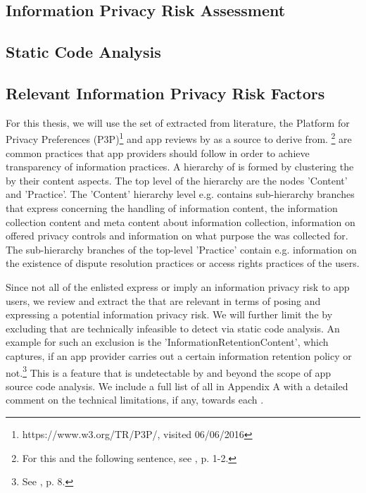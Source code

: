 \subsection{Information Privacy Risk Assessment}

\subsection{Static Code Analysis}

\subsection{Relevant Information Privacy Risk Factors}

For this thesis, we will use the set of \ipp extracted from literature, the Platform for Privacy Preferences (\acs{P3P})\footnote{https://www.w3.org/TR/P3P/, visited 06/06/2016} and app reviews by \cite{Dehling2016} as a source to derive \iprfs from. \footnote{For this and the following sentence, see \cite{Dehling2016}, p. 1-2.} 
\Ipp are common practices that app providers should follow in order to achieve transparency of information practices.
A hierarchy of \ipp is formed by clustering the \ipp by their content aspects. 
The top level of the hierarchy are the nodes 'Content' and 'Practice'.
The 'Content' hierarchy level e.g. contains sub-hierarchy branches that express \ipp concerning the handling of information content, the information collection content and meta content about information collection, information on offered privacy controls and information on what purpose the \ipp was collected for.
The sub-hierarchy branches of the top-level 'Practice' contain e.g. information on the existence of dispute resolution practices or access rights practices of the users.

Since not all of the enlisted \ipp express or imply an information privacy risk to app users, we review and extract the \ipp that are relevant in terms of posing and expressing a potential information privacy risk.
We will further limit the \ipp by excluding \ipp that are technically infeasible to detect via static code analysis.
An example for such an exclusion is the \ipp 'InformationRetentionContent', which captures, if an app provider carries out a certain information retention policy or not.\footnote{See \cite{Dehling2016}, p. 8.}
This is a feature that is undetectable by \sca and beyond the scope of app source code analysis.
We include a full list of all \ipp in Appendix A with a detailed comment on the technical limitations, if any, towards each \ipp.
